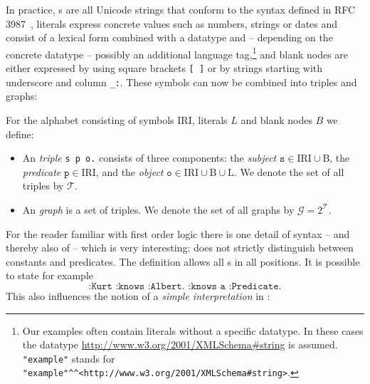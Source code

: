 In practice, \iri{}s are all Unicode strings that conform to the syntax defined in RFC 3987~\cite{iri}, 
literals express concrete values such as numbers, strings or dates and consist of a lexical form combined with a datatype \iri and -- depending on the concrete datatype -- possibly 
an additional
language 
tag,\footnote{Our examples often contain literals without a specific datatype. In these cases the datatype  \url{http://www.w3.org/2001/XMLSchema\#string} is assumed.
\texttt{"example"} stands for \texttt{"example"\textasciicircum\textasciicircum<http://www.w3.org/2001/XMLSchema\#string>}.} and blank nodes 
are either expressed by using square brackets \texttt{[~]} or by strings starting with underscore and column \texttt{\_:}.
These symbols can now be combined into triples and graphs:

\begin{definition}
 For the \rdf alphabet consisting of \iri symbols $\mathrm{IRI}$, literals $L$ and blank nodes $B$ we define:
\begin{itemize}
\item An \emph{\rdf triple} \texttt{s p o.} consists of three components: the \emph{subject}  $\texttt{s}\in \mathrm{IRI}\cup\mathrm{B}$, 
   the \emph{predicate} $\texttt{p}\in\mathrm{IRI}$, and
   the \emph{object} $\texttt{o}\in\mathrm{IRI}\cup\mathrm{B}\cup\mathrm{L}$. We denote the set of all \rdf triples by $\mathcal{T}$.
\item An \emph{\rdf graph} is a set of \rdf triples.   We denote the set of all \rdf graphs by $\mathcal{G}=2^\mathcal{T}$.
\end{itemize}
\end{definition}

For the reader familiar with first order logic there is one detail of \rdf{} syntax -- and thereby also of \nthree{} -- which is very interesting: \rdf does not strictly distinguish between 
constants and predicates. The definition allows all \iri{}s in all positions. It is possible to state for example
\begin{equation}\label{urisubpred}
\texttt{ :Kurt :knows :Albert. :knows a :Predicate. }
\end{equation}
This also influences the notion of a \emph{simple interpretation} in \rdf:


